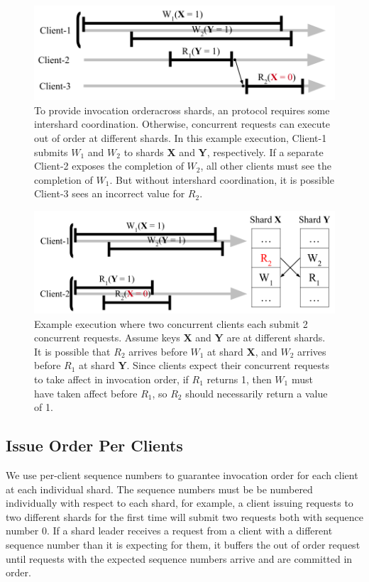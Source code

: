 \begin{figure}[!htb]
\includegraphics[scale=.45]{invocation_ordering_across_shards.png}
\caption{To provide invocation orderacross shards, an \md protocol requires some intershard coordination. Otherwise, concurrent requests can execute out of order at different shards. In this example execution, Client-1 submits $W_1$ and $W_2$ to shards \textbf{X} and \textbf{Y}, respectively. If a separate Client-2 exposes the completion of $W_2$, all other clients must see the completion of $W_1$. But without intershard coordination, it is possible Client-3 sees an incorrect value for $R_2$.}
\label{fig:invOrdAcrossShards}
\end{figure}

\begin{figure}[!htb]
\includegraphics[scale=.45]{somet.png}
\caption{Example execution where two concurrent clients each submit 2 concurrent requests. Assume keys \textbf{X} and \textbf{Y} are at different shards. It is possible that $R_2$ arrives before $W_1$ at shard \textbf{X}, and $W_2$ arrives before $R_1$ at shard \textbf{Y}. Since clients expect their concurrent requests to take affect in invocation order, if $R_1$ returns 1, then $W_1$ must have taken affect before $R_1$, so $R_2$ should necessarily return a value of 1.}
\label{fig:concurrentbatches}
\end{figure}

\subsection{Issue Order Per Clients}
We use per-client sequence numbers to guarantee invocation order for each client at each individual shard. The sequence numbers must be be numbered individually with respect to each shard, for example, a client issuing requests to two different shards for the first time will submit two requests both with sequence number 0. If a shard leader receives a request from a client with a different sequence number than it is expecting for them, it buffers the out of order request until requests with the expected sequence numbers arrive and are committed in order.

